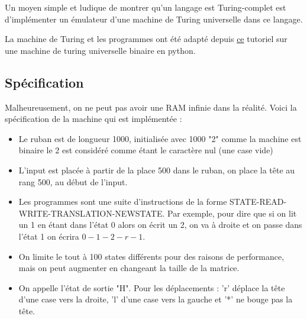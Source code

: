 \documentclass[11pt,colorlinks=true,a4paper]{article}
\begin{document}
    Un moyen simple et ludique de montrer qu'un langage est Turing-complet est d'implémenter un émulateur d'une machine de Turing 
    universelle dans ce langage.\par 
    \bigskip 
    La machine de Turing et les programmes ont été adapté depuis \href{https://sandipanweb.wordpress.com/2020/08/08/simulating-a-turing-machine-with-python-and-executing-programs/}{ce} tutoriel sur une machine de turing universelle binaire 
    en python.
    \subsection{Spécification}
    Malheureusement, on ne peut pas avoir une RAM infinie dans la réalité. Voici la spécification de la machine qui est implémentée :
    \begin{itemize}
        \item Le ruban est de longueur 1000, initialisée avec 1000 "2" comme la machine est binaire le 2 est considéré comme étant le caractère 
        nul (une case vide)
        \item L'input est placée à partir de la place 500 dans le ruban, on place la tête au rang 500, au début de l'input.
        \item Les programmes sont une suite d'instructions de la forme STATE-READ-WRITE-TRANSLATION-NEWSTATE. Par exemple, pour dire 
        que si on lit un 1 en étant dans l'état 0 alors on écrit un 2, on va à droite et on passe dans l'état 1 on écrira $0-1-2-r-1$.
        \item On limite le tout à 100 states différents pour des raisons de performance, mais on peut augmenter en changeant la taille de la matrice.
        \item On appelle l'état de sortie "H". Pour les déplacements : 'r' déplace la tête d'une case vers la droite, 'l' d'une case 
        vers la gauche et '*' ne bouge pas la tête.
    \end{itemize}
\end{document}

